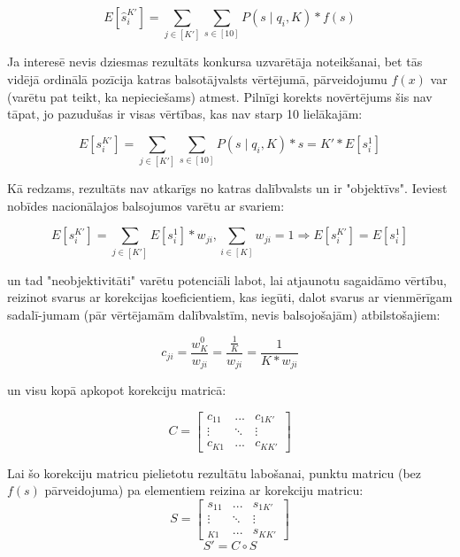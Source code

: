 \documentclass[12pt, a4paper]{article}
\begin{document}
\begin{equation}
    E[\hat s_i^{K'}] = \sum_{j\in [K']}\sum_{s\in[10]}P(s\mid q_i, K)*f(s)
\end{equation}

Ja interesē nevis dziesmas rezultāts konkursa uzvarētāja noteikšanai, bet tās vidējā ordinālā pozīcija katras balsotājvalsts vērtējumā, pārveidojumu $f(x)$ var (varētu pat teikt, ka nepieciešams) atmest. Pilnīgi korekts novērtējums šis nav tāpat, jo pazudušas ir visas vērtības, kas nav starp 10 lielākajām:

\begin{equation}
    E[s_i^{K'}] = \sum_{j\in [K']}\sum_{s\in[10]}P(s\mid q_i, K)*s = K'*E[s_i^1]
\end{equation}

Kā redzams, rezultāts nav atkarīgs no katras dalībvalsts un ir "objektīvs". Ieviest nobīdes nacionālajos balsojumos varētu ar svariem:

\begin{equation}
    E[s_i^{K'}] = \sum_{j\in [K']}E[s_i^{1}]*w_{ji}, \sum_{i\in[K]} w_{ji} = 1 \Rightarrow  E[s_i^{K'}] = E[s_i^{1}]
\end{equation}

un tad "neobjektivitāti" varētu potenciāli labot, lai atjaunotu sagaidāmo vērtību, reizinot svarus ar korekcijas koeficientiem, kas iegūti, dalot svarus ar vienmērīgam sadalī-jumam (pār vērtējamām dalībvalstīm, nevis balsojošajām) atbilstošajiem:

\begin{equation}
    c_{ji}=\frac{w_{K}^0}{w_{ji}}=\frac{\frac{1}{K}}{w_{ji}}=\frac{1}{K*w_{ji}}
\end{equation}

un visu kopā apkopot korekciju matricā:

\begin{equation}
    C=
    \begin{bmatrix}
        c_{11} &  ... & c_{1K'} \\
        \vdots & \ddots & \vdots \\
        c_{K1} &  ... & c_{KK'} 
    \end{bmatrix}
\end{equation}

Lai šo korekciju matricu pielietotu rezultātu labošanai, punktu matricu (bez $f(s)$ pārveidojuma) pa elementiem reizina ar korekciju matricu:
\begin{equation}
    S=
    \begin{bmatrix}
        s_{11} &  ... & s_{1K'} \\
        \vdots & \ddots & \vdots \\
        _{K1} &  ... & s_{KK'} 
    \end{bmatrix}
\end{equation}
\begin{equation}
    S' = C \circ S
\end{equation}
\end{document}

